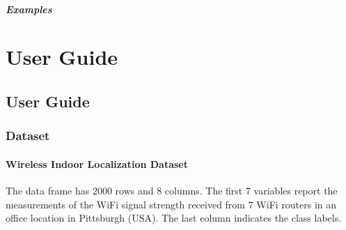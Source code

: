 \documentclass[letterpaper,10pt,english,openany,oneside]{sphinxmanual}
\begin{document}
\begin{fulllineitems}
\paragraph{Examples}
\label{\detokenize{api_reference/generated/QuadratiK.tools.plot_clusters_2d:examples}}
\begin{sphinxVerbatim}[commandchars=\\\{\}]
   
   
  
     
\end{sphinxVerbatim}

\end{fulllineitems}





\chapter{User Guide}
\label{\detokenize{index:id3}}
\sphinxstepscope


\section{User Guide}
\label{\detokenize{user_guide/index:user-guide}}\label{\detokenize{user_guide/index::doc}}

\subsection{Dataset}
\label{\detokenize{user_guide/index:dataset}}
\sphinxstepscope


\subsubsection{Wireless Indoor Localization Dataset}
\label{\detokenize{user_guide/datasets:wireless-indoor-localization-dataset}}\label{\detokenize{user_guide/datasets:datasets}}\label{\detokenize{user_guide/datasets:id1}}\label{\detokenize{user_guide/datasets::doc}}
\sphinxAtStartPar
The  data frame has 2000 rows and 8 columns. The first 7 variables
report the measurements of the Wi\sphinxhyphen{}Fi signal strength received from 7 Wi\sphinxhyphen{}Fi routers in an
office location in Pittsburgh (USA). The last column indicates the class labels.
\end{document}

